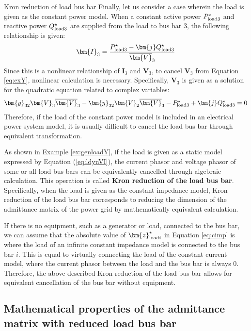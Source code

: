 \documentclass[graybox, envcountchap]{svmult}
\begin{document}
\begin{example}{Kron reduction of load bus bar}
Finally, let us consider a case wherein the load is given as the constant power model.
When a constant active power $P_{{\rm load}3}^{\star}$ and reactive power $Q_{{\rm load}3}^{\star}$ are supplied from the load to bus bar 3, the following relationship is given:
\begin{equation*}
\bm{I}_3 = \frac{P_{{\rm load}3}^{\star} - \bm{j} Q_{{\rm load}3}^{\star} }{\overline{\bm{V}}_3}
\end{equation*}
Since this is a nonlinear relationship of $\bm{I}_3$ and $\bm{V}_3$, to cancel $\bm{V}_3$ from Equation \ref{eq:exY}, nonlinear calculation is necessary.
Specifically, $\bm{V}_3$ is given as a solution for the quadratic equation related to complex variables:
\begin{equation*}
\bm{y}_{32} \bm{V}_3 \overline{\bm{V}}_3 - \bm{y}_{32}  \bm{V}_2 \overline{\bm{V}}_3 -P_{{\rm load}3}^{\star} 
+ \bm{j} Q_{{\rm load}3}^{\star} =0
\end{equation*}
Therefore, if the load of the constant power model is included in an electrical power system model, it is usually difficult to cancel the load bus bar through equivalent transformation.
\end{example}

As shown in Example \ref{ex:genloadY}, if the load is given as a static model expressed by Equation (\ref{eq:ldynVI}), the current phasor and voltage phasor of some or all load bus bars can be equivalently cancelled through algebraic calculation.
This operation is called \textbf{Kron reduction of the load bus bar}.
Specifically, when the load is given as the constant impedance model, Kron reduction of the load bus bar corresponds to reducing the dimension of the admittance matrix of the power grid by mathematically equivalent calculation.

If there is no equipment, such as a generator or load, connected to the bus bar, we can assume that the absolute value of $\bm{z}_{{\rm load}i}^{\star}$ in Equation \ref{eq:cimp} is where the load of an infinite constant impedance model is connected to the bus bar $i$.
This is equal to virtually connecting the load of the constant current model, where the current phasor between the load and the bus bar is always 0.
Therefore, the above-described Kron reduction of the load bus bar allows for equivalent cancellation of the bus bar without equipment.


\subsection{Mathematical properties of the admittance matrix with reduced load bus bar}
\end{document}
